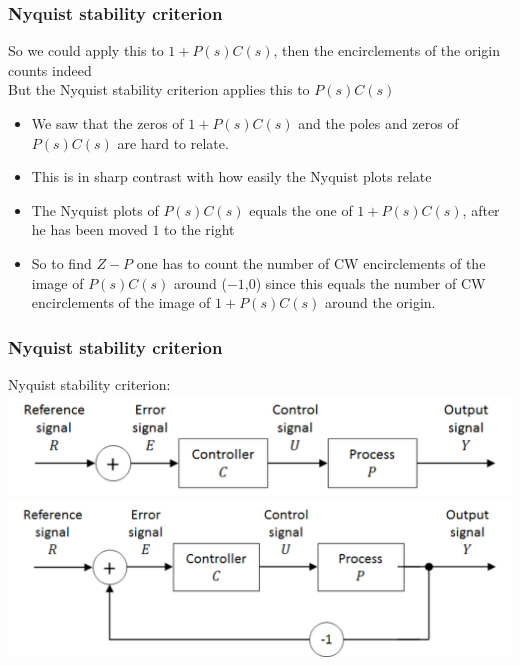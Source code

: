 \begin{frame}
\frametitle{Nyquist stability criterion}
So we could apply this to $1+P(s)C(s)$, then the encirclements of the origin counts indeed
\\But the Nyquist stability criterion applies this to $P(s)C(s)$
\begin{itemize} 
\item We saw that the zeros of $1+P(s)C(s)$ and the poles and zeros of $P(s)C(s)$ are hard to relate.
\item This is in sharp contrast with how easily the Nyquist plots relate
\item The Nyquist plots of $P(s)C(s)$ equals the one of $1+P(s)C(s)$, after he has been moved $1$ to the right
\item So to find $Z-P $ one has to count the number of CW encirclements of the image of $P(s)C(s)$ around ($-1$,$0$) since this equals the number of CW encirclements of the image of $1+P(s)C(s)$ around the origin.
\end{itemize}
\end{frame}

\begin{frame}
\frametitle{Nyquist stability criterion}
Nyquist stability criterion:
\\ 
\includegraphics[width=0.7\linewidth]{Afbeelding10}
\\ \includegraphics[width=0.7\linewidth]{Afbeelding11}
\end{frame}

